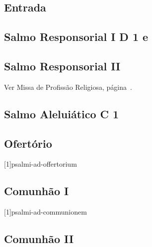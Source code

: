 
\subsection{Entrada}\label{subsection:missae-pro-varii-necessitatibus/pro-vocationibus/introitus}

\subsection[Salmo Responsorial I]{Salmo Responsorial I \textmd{D 1 e}}\label{subsection:missae-pro-varii-necessitatibus/pro-vocationibus/psalmus-responsorius}

\subsection{Salmo Responsorial II}
\begin{rubrica}
  Ver Missa de Profissão Religiosa, página~\pageref{subsection:missae-rituales/missa-in-professione-religiosa/psalmus-responsorius-2}.
\end{rubrica}

\AllowPageFlush

\subsection[Salmo Aleluiático]{Salmo Aleluiático \textmd{C 1}}\label{subsection:missae-pro-varii-necessitatibus/pro-vocationibus/psalmus-alleluiaticus}

\AllowPageFlush

\subsection{Ofertório}\label{subsection:missae-pro-varii-necessitatibus/pro-vocationibus/offertorium}
[1]{psalmi-ad-offertorium}

\AllowPageFlush

\subsection{Comunhão I}\label{subsection:missae-pro-varii-necessitatibus/pro-vocationibus/communio-1}
[1]{psalmi-ad-communionem}

\AllowPageBreak

\subsection{Comunhão II}\label{subsection:missae-pro-varii-necessitatibus/pro-vocationibus/communio-2}
